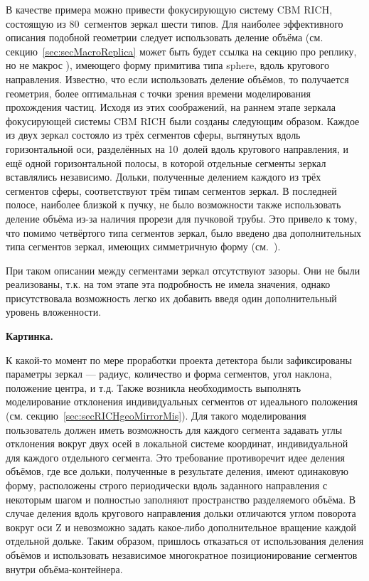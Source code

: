 В качестве примера можно привести фокусирующую систему CBM RICH, состоящую из 80~сегментов зеркал шести типов. Для наиболее эффективного описания подобной геометрии следует использовать деление объёма (см. секцию~\ref{sec:secMacroReplica} \todo может быть будет ссылка на секцию про реплику, но не макрос \todo), имеющего форму примитива типа sphere, вдоль кругового направления. Известно, что если использовать деление объёмов, то получается геометрия, более оптимальная с точки зрения времени моделирования прохождения частиц. Исходя из этих соображений, на раннем этапе зеркала фокусирующей системы CBM RICH были созданы следующим образом. Каждое из двух зеркал состояло из трёх сегментов сферы, вытянутых вдоль горизонтальной оси, разделённых на 10~долей вдоль кругового направления, и ещё одной горизонтальной полосы, в которой отдельные сегменты зеркал вставлялись независимо. Дольки, полученные делением каждого из трёх сегментов сферы, соответствуют трём типам сегментов зеркал. В последней полосе, наиболее близкой к пучку, не было возможности также использовать деление объёма из-за наличия прорези для пучковой трубы. Это привело к тому, что помимо четвёртого типа сегментов зеркал, было введено два дополнительных типа сегментов зеркал, имеющих симметричную форму (см.~\figref{}).

При таком описании между сегментами зеркал отсутствуют зазоры. Они не были реализованы, т.к. на том этапе эта подробность не имела значения, однако присутствовала возможность легко их добавить введя один дополнительный уровень вложенности.

\todo
\textbf{Картинка.}

К какой-то момент по мере проработки проекта детектора были зафиксированы параметры зеркал --- радиус, количество и форма сегментов, угол наклона, положение центра, и т.д. Также возникла необходимость выполнять моделирование отклонения индивидуальных сегментов от идеального положения (см. секцию~\ref{sec:secRICHgeoMirrorMis}). Для такого моделирования пользователь должен иметь возможность для каждого сегмента задавать углы отклонения вокруг двух осей в локальной системе координат, индивидуальной для каждого отдельного сегмента. Это требование противоречит идее деления объёмов, где все дольки, полученные в результате деления, имеют одинаковую форму, расположены строго периодически вдоль заданного направления с некоторым шагом и полностью заполняют пространство разделяемого объёма. В случае деления вдоль кругового направления дольки отличаются углом поворота вокруг оси Z и невозможно  задать какое-либо дополнительное вращение каждой отдельной дольке. Таким образом, пришлось отказаться от использования деления объёмов и использовать независимое многократное позиционирование сегментов внутри объёма-контейнера.

